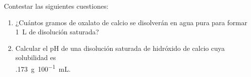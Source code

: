 Contestar las siguientes cuestiones:
\begin{enumerate}[label={\alph*)},font={\color{red!50!black}\bfseries}]
    \item ¿Cuántos gramos de oxalato de calcio se disolverán en agua pura para formar \SI{1}{\liter} de disolución saturada?
    \item Calcular el pH de una disolución saturada de hidróxido de calcio cuya solubilidad es\\
    	  \SI{,173}{\gram\per 100\milli\liter}.
\end{enumerate}
